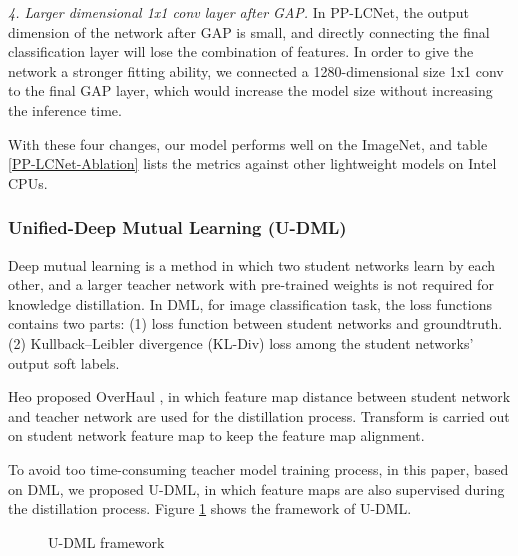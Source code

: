 \documentclass[letterpaper]{article} %
\begin{document}
\textit{4. Larger dimensional 1x1 conv layer after GAP.}
In PP-LCNet, the output dimension of the network after GAP is small, and directly connecting the final classification layer will lose the combination of features. In order to give the network a stronger fitting ability, we connected a 1280-dimensional size 1x1 conv to the final GAP layer, which would increase the model size without increasing the inference time.

With these four changes, our model performs well on the ImageNet, and table \ref{PP-LCNet-Ablation} lists the metrics against other lightweight models on Intel CPUs.


\subsubsection{Unified-Deep Mutual Learning (U-DML)}

Deep mutual learning \cite{dml2017} is a method in which two student networks learn by each other, and a larger teacher network with pre-trained weights is not required for knowledge distillation. In DML, for image classification task, the loss functions contains two parts: (1) loss function between student networks and groundtruth. (2) Kullback–Leibler divergence (KL-Div) loss among the student networks' output soft labels.

Heo proposed OverHaul \cite{Overhaul}, in which feature map distance between student network and teacher network are used for the distillation process. Transform is carried out on student network feature map to keep the feature map alignment.

To avoid too time-consuming teacher model training process, in this paper, based on DML, we proposed U-DML, in which feature maps are also supervised during the distillation process. Figure \ref{udml_framework} shows the framework of U-DML.

\begin{figure}[h!]
\centering
{}
\caption{U-DML framework}
\label{udml_framework}
\end{figure}
\end{document}
